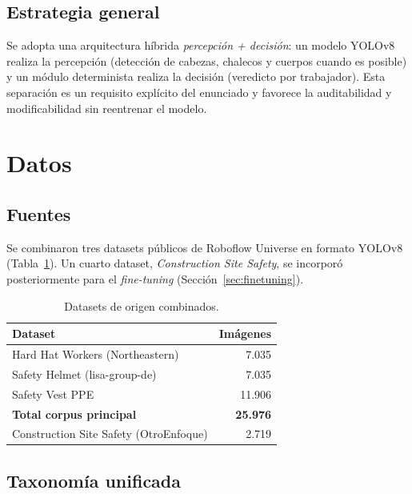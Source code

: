 \documentclass[conference]{IEEEtran}
\begin{document}
\subsection{Estrategia general}

Se adopta una arquitectura híbrida \emph{percepción + decisión}:
un modelo YOLOv8 realiza la percepción (detección de cabezas,
chalecos y cuerpos cuando es posible) y un módulo determinista
realiza la decisión (veredicto por trabajador). Esta separación es
un requisito explícito del enunciado y favorece la auditabilidad y
modificabilidad sin reentrenar el modelo.

\section{Datos}

\subsection{Fuentes}

Se combinaron tres datasets públicos de Roboflow Universe
\cite{roboflow} en formato YOLOv8 (Tabla~\ref{tab:datasets}). Un
cuarto dataset, \emph{Construction Site Safety}, se incorporó
posteriormente para el \textit{fine-tuning}
(Sección~\ref{sec:finetuning}).

\begin{table}[h]
\centering
\caption{Datasets de origen combinados.}
\label{tab:datasets}
\renewcommand{\arraystretch}{1.15}
\begin{tabular}{l r}
\toprule
\textbf{Dataset} & \textbf{Imágenes} \\
\midrule
Hard Hat Workers (Northeastern) & 7.035 \\
Safety Helmet (lisa-group-de) & 7.035 \\
Safety Vest PPE & 11.906 \\
\midrule
\textbf{Total corpus principal} & \textbf{25.976} \\
\midrule
Construction Site Safety (OtroEnfoque) & 2.719 \\
\bottomrule
\end{tabular}
\end{table}

\subsection{Taxonomía unificada}
\end{document}
